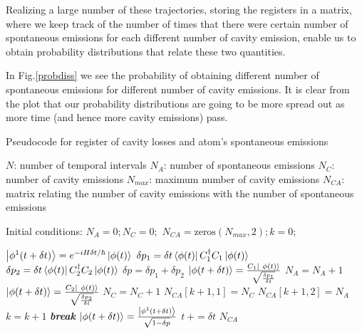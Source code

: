 \documentclass[conference]{IEEEtran}
\begin{document}
Realizing a large number of these trajectories, storing the registers in a matrix, where we keep track of the number of times that there were certain number of spontaneous emissions for each different number of cavity emission, enable us to obtain probability distributions that relate these two quantities.  

In Fig.\ref{probdiss} we see the probability of obtaining different number of spontaneous emissions for different number of cavity emissions. It is clear from the plot that our probability distributions are going to be more spread out as more time (and hence more cavity emissions) pass.


\begin{algorithm}[!t]
\caption{Pseudocode for register of cavity losses and atom's spontaneous emissions}
\label{alg1}
\begin{algorithmic}
\STATE $N$: number of temporal intervals
\STATE $N_A $: number of spontaneous emissions
\STATE $N_C$: number of cavity emissions
\STATE $N_{max}$: maximum number of cavity emissions
\STATE $N_{CA}$: matrix relating the number of cavity emissions with the number of spontaneous emissions

\STATE
\STATE Initial conditions:
\STATE $N_A = 0; N_C = 0;$
\STATE $N_{CA} = \text{zeros}(N_{max},2);  k = 0;$ 

\STATE 


\STATE $\ket{ \phi^1(t + \delta t)} = e^{-iH\delta t/\hbar}\ket{\phi (t)}$
\STATE$ \delta p_1 = \delta t\bra{\phi(t)}C^\dagger_1 C_1\ket{\phi(t)}$
\STATE $ \delta p_2 =  \delta t\bra{\phi(t)}C^\dagger_2 C_2\ket{\phi(t)}$
\STATE $\delta p = \delta p_1 + \delta p_2$
\STATE $\ket{\phi (t + \delta t)} = \frac{C_1 \ket{ \ \phi(t)}}{\sqrt \frac{\delta p_1}{\delta t}}$
\STATE $N_A = N_A + 1$
\ELSE
\STATE $\ket{\phi (t + \delta t)} = \frac{C_2 \ket{ \ \phi(t)}}{\sqrt \frac{\delta p_2}{\delta t}}$
\STATE $N_C = N_C + 1$
\STATE $N_{CA}[k+1,1] = N_C$
\STATE  $N_{CA}[k+1,2] = N_A$
\STATE $k = k+1$
\STATE \textbf{\textit{break}}
\ENDIF
\ENDIF
\ELSE
\STATE $\ket{ \phi(t + \delta t)} = \frac{\ket{\phi^1 (t+ \delta t)}}{\sqrt{1-\delta p}}$
\STATE $t \ += \delta t$
\ENDIF
\ENDFOR
\RETURN  $N_{CA}$

\end{algorithmic}

\end{algorithm}
\end{document}
